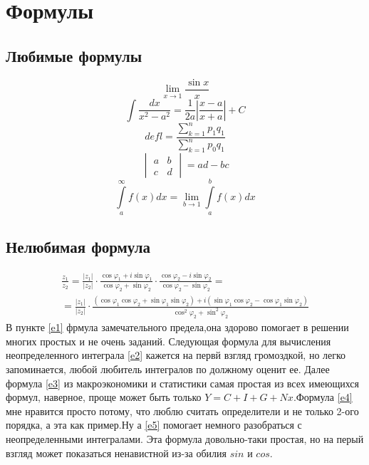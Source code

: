 \documentclass[12pt, a4paper]{article}
\begin{document}
\section{Формулы}
\subsection{Любимые формулы}
\begin{equation}\tag{æ} \label{e1}\lim\limits_{x \to 1} \frac{\sin x}{x}
\end{equation}
\begin{equation}\tag{ææ} \label{e2}\int \frac{dx}{x^2-a^2}=\frac{1}{2a}\left|\frac{x-a}{x+a}\right|+C
\end{equation}
\begin{equation}\tag{æææ}\label{e3} defl=\frac{\sum\nolimits_{k=1}^n p_1 q_1}{\sum\nolimits_{k=1}^n p_0 q_1}
\end{equation}
\begin{equation}\tag{ææææ}\label{e4}\begin{vmatrix} a & b \\ c & d \end{vmatrix}=ad-bc
\end{equation}
\begin{equation}\tag{æææææ}\label{e5}\int\limits_a^{\infty}f(x)dx=\lim\limits_{b \to 1}\int\limits_a^b f(x)dx 
\end{equation}

\subsection{Нелюбимая формула}

\begin{multline*}\tag{ææææææ}\label{e6}
\frac{z_1}{z_2}=\frac{|z_1|}{|z_2|} \cdot \frac{\cos \varphi_1+i\sin \varphi_1}{\cos \varphi_2+\sin \varphi_2} \cdot \frac{\cos \varphi_2-i\sin \varphi_2}{\cos \varphi_2-\sin \varphi_2}= \\ = \frac{|z_1|}{|z_2|} \cdot \frac{(\cos \varphi_1 \cos \varphi_2+\sin \varphi_1\sin \varphi_2)+i(\sin \varphi_1 \cos \varphi_2-\cos \varphi_1 \sin \varphi_2)}{\cos ^2\varphi_2+\sin^2 \varphi_2}
\end{multline*}
В пункте \ref{e1} фрмула замечательного предела,она здорово помогает в решении многих простых и не очень заданий. Следующая формула для вычисления неопределенного интеграла \ref{e2} кажется на первй взгляд громоздкой, но легко запоминается, любой любитель интегралов по должному оценит ее. Далее формула \ref{e3} из макроэкономики и статистики самая простая из всех имеющихся формул, наверное, проще может быть только $Y=C+I+G+Nx$.Формула \ref{e4} мне нравится просто потому, что люблю считать определители и не только 2-ого порядка, а эта как пример.Ну а \ref{e5} помогает немного разобраться с неопределенными интегралами. Эта формула довольно-таки простая, но на перый взгляд может показаться ненавистной из-за обилия $sin$ и $cos$.
\end{document}
